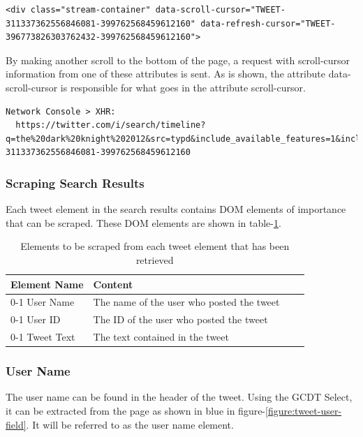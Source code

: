   \begin{lstlisting}[caption={TODO: Caption},label={},captionpos=b]
  <div class="stream-container" data-scroll-cursor="TWEET-311337362556846081-399762568459612160" data-refresh-cursor="TWEET-396773826303762432-399762568459612160">
  \end{lstlisting}

By making another scroll to the bottom of the page, a request with scroll-cursor information from one of these attributes is sent.
As is shown, the attribute data-scroll-cursor is responsible for what goes in the attribute scroll-cursor.

  \begin{lstlisting}[caption={TODO: Caption},label={},captionpos=b]
  Network Console > XHR:
  https://twitter.com/i/search/timeline?q=the%20dark%20knight%202012&src=typd&include_available_features=1&include_entities=1&last_note_ts=0&scroll_cursor=TWEET-311337362556846081-399762568459612160
  \end{lstlisting}

\subsubsection{Scraping Search Results}

Each tweet element in the search results contains DOM elements of importance that can be scraped. These DOM elements are shown in table-\ref{table:important-tweet-element-elements}.

\begin{table}[H]
\centering
\begin{tabularx}{5.3\textwidth}{ lp{7cm} lp{5cm} }
  \textbf{Element Name} & \textbf{Content}\\
  \cline{0-1}
  User Name & The name of the user who posted the tweet \\
  \cline{0-1}
  User ID & The ID of the user who posted the tweet \\
  \cline{0-1}
  Tweet Text & The text contained in the tweet
\end{tabularx}
\caption{Elements to be scraped from each tweet element that has been retrieved}
\label{table:important-tweet-element-elements}
\end{table}

\subsubsection{User Name}
The user name can be found in the header of the tweet. Using the GCDT Select, it can be extracted from the page as shown in blue in figure-\ref{figure:tweet-user-field}. It will be referred to as the user name element.

